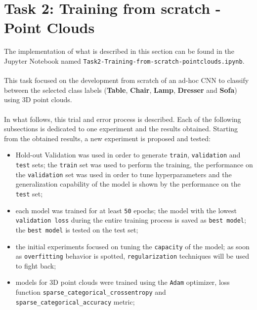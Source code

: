 \documentclass[11pt,a4paper]{article}
\begin{document}
\section{Task 2: Training from scratch - Point Clouds}
The implementation of what is described in this section can be found in the Jupyter Notebook named \texttt{Task2-Training-from-scratch-pointclouds.ipynb}.\\
\\
This task focused on the development from scratch of an ad-hoc CNN to classify between the selected class labels (\textbf{Table}, \textbf{Chair}, \textbf{Lamp}, \textbf{Dresser} and \textbf{Sofa}) using 3D point clouds.\\
\\
In what follows, this trial and error process is described. Each of the following subsections is dedicated to one experiment and the results obtained. Starting from the obtained results, a new experiment is proposed and tested:
\begin{itemize}
    \item Hold-out Validation was used in order to generate \texttt{train}, \texttt{validation} and \texttt{test} sets; the \texttt{train} set was used to perform the training, the performance on the \texttt{validation} set was used in order to tune hyperparameters and the generalization capability of the model is shown by the performance on the \texttt{test} set;
    \item each model was trained for at least \texttt{50} epochs; the model with the lowest \texttt{validation loss} during the entire training process is saved as \texttt{best model}; the \texttt{best model} is tested on the test set;
    \item the initial experiments focused on tuning the \texttt{capacity} of the model; as soon as \texttt{overfitting} behavior is spotted, \texttt{regularization} techniques will be used to fight back;
    \item models for 3D point clouds were trained using the \texttt{Adam} optimizer, loss function \texttt{sparse\_categorical\_crossentropy} and \texttt{sparse\_categorical\_accuracy} metric;
\end{itemize}
\end{document}
